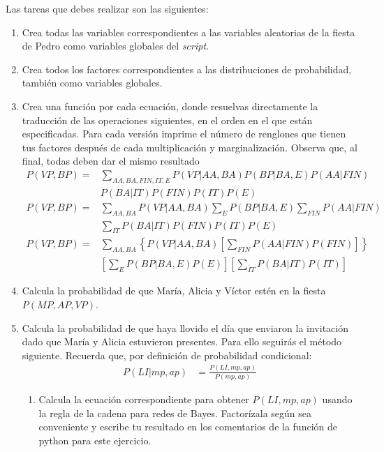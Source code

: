 Las tareas que debes realizar son las siguientes:
\begin{enumerate}
 \item Crea todas las variables correspondientes a las variables aleatorias de la fiesta de Pedro como variables globales del \textit{script}.
 
 \item Crea todos los factores correspondientes a las distribuciones de probabilidad, también como variables globales.
 
 \item Crea una función por cada ecuación, donde resuelvas directamente la traducción de las operaciones siguientes, en el orden en el que están especificadas.  Para cada versión imprime el número de renglones que tienen tus factores después de cada multiplicación y marginalización. Observa que, al final, todas deben dar el mismo resultado
 \begin{align}
  P(VP,BP) =& \sum_{AA,BA,FIN,IT,E} P(VP|AA,BA)P(BP|BA,E)P(AA|FIN) \\
            & P(BA|IT)P(FIN)P(IT)P(E) \nonumber \\
  P(VP,BP) =& \sum_{AA,BA} P(VP|AA,BA)\sum_E P(BP|BA,E)\sum_{FIN}P(AA|FIN) \\
            & \sum_{IT}P(BA|IT)P(FIN)P(IT)P(E) \nonumber \\
  P(VP,BP) =& \sum_{AA,BA} \left\lbrace P(VP|AA,BA) \left[\sum_{FIN}P(AA|FIN)P(FIN)\right] \right\rbrace \\
            & \left[\sum_E P(BP|BA,E)P(E)\right] \left[ \sum_{IT}P(BA|IT)P(IT) \right] \nonumber
 \end{align}
 
 \item Calcula la probabilidad de que María, Alicia y Víctor estén en la fiesta $P(MP,AP,VP)$.
 
 \item Calcula la probabilidad de que haya llovido el día que enviaron la invitación dado que María y Alicia estuvieron presentes.  Para ello seguirás el método siguiente.
 Recuerda que, por definición de probabilidad condicional:
 \begin{align*}
   P(LI|mp,ap) &= \frac{P(LI,mp,ap)}{P(mp,ap)}
 \end{align*}
  
 \begin{enumerate}
  \item Calcula la ecuación correspondiente para obtener $P(LI,mp,ap)$ usando la regla de la cadena para redes de Bayes.  Factorízala según sea conveniente y escribe tu resultado en los comentarios de la función de python para este ejercicio.
  

\end{enumerate}
\end{enumerate}
